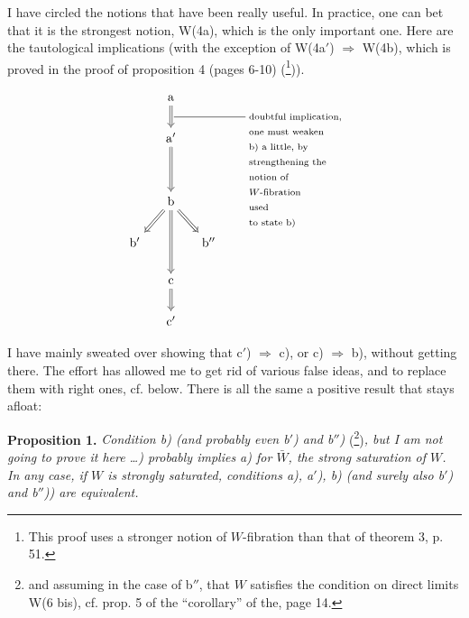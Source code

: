 
I have circled the notions that have been really useful. In practice, one can bet that it is the strongest notion, W(4a), which is the only important one. Here are the tautological implications (with the exception of W(4a$'$) $\Longrightarrow$ W(4b), which is proved in the proof of proposition 4 (pages 6-10) (\footnote[61]{This proof uses a stronger notion of $W$-fibration than that of theorem 3, p. 51.})).


\[
\begin{tikzcd}[column sep=small]
& \mathrm{a} \arrow[d,Rightarrow] & \\
& \mathrm{a}' \arrow[dd,Rightarrow,"{\text{\rule[0.6ex]{2cm}{0.4pt}\ \begin{tabular}[t]{@{}l@{}}doubtful implication,\\ one must weaken\\ b) a little, by\\ strengthening the\\ notion of\\ $W$-fibration\\ used\\ to state b)\end{tabular}}}"] & \\
& & \\
& \mathrm{b} \arrow[dl,Rightarrow] \arrow[dr,Rightarrow] \arrow[dd,Rightarrow] & \\
\mathrm{b}' & & \mathrm{b}'' \\
& \mathrm{c} \arrow[d,Rightarrow] & \\
& \mathrm{c}' &
\end{tikzcd}
\]

I have mainly sweated over showing that c$'$) $\Longrightarrow$ c), or c) $\Longrightarrow$ b), without getting there. The effort has allowed me to get rid of various false ideas, and to replace them with right ones, cf. below. There is all the same a positive result that stays afloat:

\textbf{Proposition 1.} \textit{Condition b) (and probably even b$'$) and b$''$)} (\footnote[62]{and assuming in the case of b$''$, that $W$ satisfies the condition on direct limits W(6 bis), cf. prop. 5 of the ``corollary'' of the, page 14.})\textit{, but I am not going to prove it here \dots) probably implies a) for $\bar{W}$, the strong saturation of $W$. In any case, if $W$ is strongly saturated, conditions a), a$'$), b) (and surely also b$'$) and b$''$)) are equivalent.}

